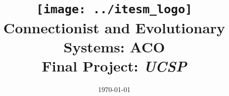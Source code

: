 \title{
  \texttt{[image: ../itesm\_logo]}
  \\[4em] Connectionist and Evolutionary Systems: ACO
  \\[1em] Final Project: \textit{UCSP} \\[3em]
}
\author{
  \begin{tabular}{l l}
		\small \myId & \myName
  \end{tabular}		
}
\date{\vfill\today}